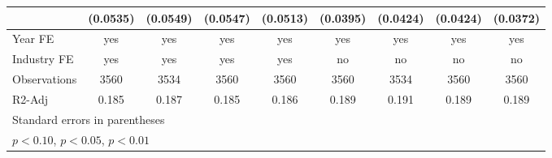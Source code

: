 \begin{table}[htbp]
\begin{tabular}{l*{8}{c}}
                    &    (0.0535)         &    (0.0549)         &    (0.0547)         &    (0.0513)         &    (0.0395)         &    (0.0424)         &    (0.0424)         &    (0.0372)         \\
\hline
Year FE             &         yes         &         yes         &         yes         &         yes         &         yes         &         yes         &         yes         &         yes         \\
Industry FE         &         yes         &         yes         &         yes         &         yes         &          no         &          no         &          no         &          no         \\
Observations        &        3560         &        3534         &        3560         &        3560         &        3560         &        3534         &        3560         &        3560         \\
R2-Adj              &       0.185         &       0.187         &       0.185         &       0.186         &       0.189         &       0.191         &       0.189         &       0.189         \\
\hline\hline
\multicolumn{9}{l}{\footnotesize Standard errors in parentheses}\\
\multicolumn{9}{l}{\footnotesize \sym{*} \(p<0.10\), \sym{**} \(p<0.05\), \sym{***} \(p<0.01\)}\\
\end{tabular}
\end{table}
